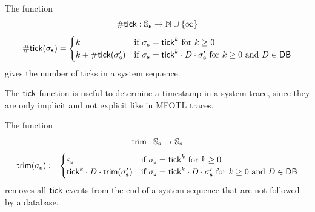 \begin{definition}
    \label{def:num-ticks}
    The function
    \vspace{-1em}
    \begin{equation*}
        \mathsf{\#tick} : \mathbb{S}_{\mathbf{s}} \to \mathbb{N} \cup \{ \infty \}
    \end{equation*}
    \vspace{-2em}
    \begin{align*}
        \mathsf{\#tick}(\sigma_{\mathbf{s}}) =
        \begin{cases}
            k
                &\text{if } \sigma_{\mathbf{s}} = \mathsf{tick}^k
                \text{ for } k \geq 0 \\
            k + \mathsf{\#tick}(\sigma'_{\mathbf{s}})
                &\text{if } \sigma_{\mathbf{s}} = \mathsf{tick}^k \cdot D \cdot \sigma'_{\mathbf{s}}
                \text{ for } k \geq 0
                \text{ and } D \in \mathsf{DB}
        \end{cases}
    \end{align*}
    gives the number of ticks in a system sequence.
\end{definition}
The $\mathsf{tick}$ function is useful to determine a timestamp in a
system trace, since they are only implicit and not
explicit like in MFOTL traces.

\begin{definition}
    \label{def:trim-system-traces}
    The function
    \vspace{-1em}
    \begin{equation*}
        \mathsf{trim}: \mathbb{S}_{\mathbf{s}} \to \mathbb{S}_{\mathbf{s}}
    \end{equation*}
    \vspace{-2em}
    \begin{align*}
        \mathsf{trim}(\sigma_{\mathbf{s}}) :=
        \begin{cases}
            \varepsilon_{\mathbf{s}}
                &\text{if } \sigma_{\mathbf{s}} = \mathsf{tick}^k
                \text{ for } k \geq 0 \\
            \mathsf{tick}^k \cdot D \cdot \mathsf{trim}(\sigma_{\mathbf{s}}')
                &\text{if } \sigma_{\mathbf{s}} = \mathsf{tick}^k \cdot D \cdot \sigma_{\mathbf{s}}'
                \text{ for } k \geq 0
                \text{ and } D \in \mathsf{DB}
        \end{cases}
    \end{align*}
    removes all $\mathsf{tick}$ events from the end of a system sequence
    that are not followed by a database.
\end{definition}

